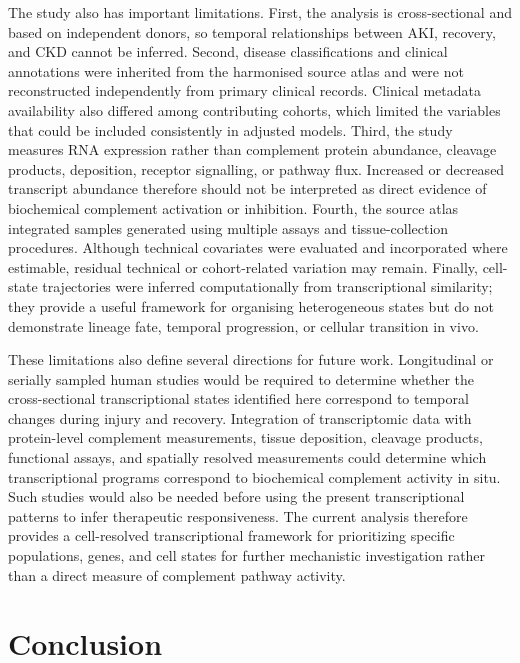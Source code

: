 \documentclass[10pt,letterpaper]{article}
\begin{document}
The study also has important limitations. First, the analysis is cross-sectional and based on independent donors, so temporal relationships between AKI, recovery, and CKD cannot be inferred. Second, disease classifications and clinical annotations were inherited from the harmonised source atlas and were not reconstructed independently from primary clinical records. Clinical metadata availability also differed among contributing cohorts, which limited the variables that could be included consistently in adjusted models. Third, the study measures RNA expression rather than complement protein abundance, cleavage products, deposition, receptor signalling, or pathway flux. Increased or decreased transcript abundance therefore should not be interpreted as direct evidence of biochemical complement activation or inhibition. Fourth, the source atlas integrated samples generated using multiple assays and tissue-collection procedures. Although technical covariates were evaluated and incorporated where estimable, residual technical or cohort-related variation may remain. Finally, cell-state trajectories were inferred computationally from transcriptional similarity; they provide a useful framework for organising heterogeneous states but do not demonstrate lineage fate, temporal progression, or cellular transition in vivo.

These limitations also define several directions for future work. Longitudinal or serially sampled human studies would be required to determine whether the cross-sectional transcriptional states identified here correspond to temporal changes during injury and recovery. Integration of transcriptomic data with protein-level complement measurements, tissue deposition, cleavage products, functional assays, and spatially resolved measurements could determine which transcriptional programs correspond to biochemical complement activity in situ. Such studies would also be needed before using the present transcriptional patterns to infer therapeutic responsiveness. The current analysis therefore provides a cell-resolved transcriptional framework for prioritizing specific populations, genes, and cell states for further mechanistic investigation rather than a direct measure of complement pathway activity.

\section*{Conclusion}
\end{document}
